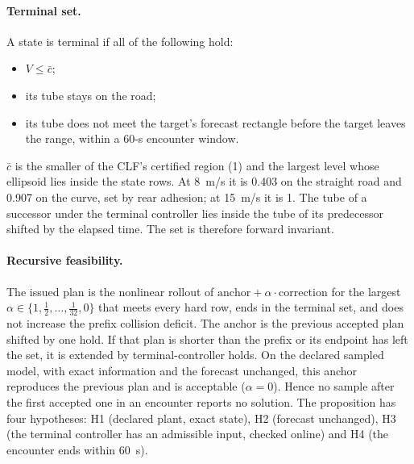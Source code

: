 \documentclass[11pt]{article}
\begin{document}
\paragraph{Terminal set.} A state is terminal if all of the following hold:
\begin{itemize}
\item $V\le\bar c$;
\item its tube stays on the road;
\item its tube does not meet the target's forecast rectangle before the
  target leaves the range, within a 60-s encounter window.
\end{itemize}
$\bar c$ is the smaller of the CLF's certified region (1) and the largest
level whose ellipsoid lies inside the state rows. At 8~m/s it is 0.403 on
the straight road and 0.907 on the curve, set by rear adhesion; at 15~m/s it
is 1. The tube of a successor under the terminal controller lies inside the
tube of its predecessor shifted by the elapsed time. The set is therefore
forward invariant.

\paragraph{Recursive feasibility.} The issued plan is the nonlinear rollout of
$\text{anchor}+\alpha\cdot\text{correction}$ for the largest
$\alpha\in\{1,\tfrac12,\dots,\tfrac1{32},0\}$ that meets every hard row, ends
in the terminal set, and does not increase the prefix collision deficit. The
anchor is the previous accepted plan shifted by one hold. If that plan is
shorter than the prefix or its endpoint has left the set, it is extended by
terminal-controller holds. On the declared sampled model, with exact
information and the forecast unchanged, this anchor reproduces the previous
plan and is acceptable ($\alpha=0$). Hence no sample after the first accepted
one in an encounter reports no solution. The proposition has four
hypotheses: H1 (declared plant, exact state), H2 (forecast unchanged), H3
(the terminal controller has an admissible input, checked online) and H4
(the encounter ends within 60~s).
\end{document}
